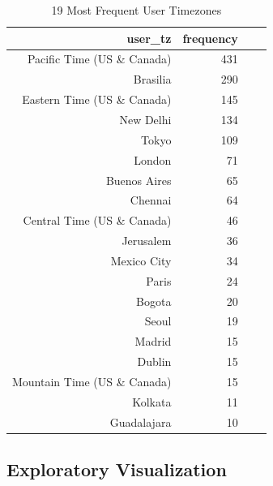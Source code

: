 \documentclass[oneside]{article}
\begin{document}
\begin{table}[]
  \centering
  \caption{19 Most Frequent User Timezones}
  \label{tab:freq_user_tz}
  \begin{tabular}{rrrr}
    \hline
     \textbf{user\_tz} & \textbf{frequency}\\
    \hline
    Pacific Time (US \& Canada)    &431 \\
    Brasilia                      &290 \\
    Eastern Time (US \& Canada)    &145 \\
    New Delhi                     &134 \\
    Tokyo                         &109 \\
    London                         &71 \\
    Buenos Aires                   &65 \\
    Chennai                        &64 \\
    Central Time (US \& Canada)     &46 \\
    Jerusalem                      &36 \\
    Mexico City                    &34 \\
    Paris                          &24 \\
    Bogota                         &20 \\
    Seoul                          &19 \\
    Madrid                         &15 \\
    Dublin                         &15 \\
    Mountain Time (US \& Canada)    &15 \\
    Kolkata                        &11 \\
    Guadalajara                    &10 \\
    \hline
  \end{tabular}
\end{table}





\subsection{Exploratory Visualization}
\end{document}
